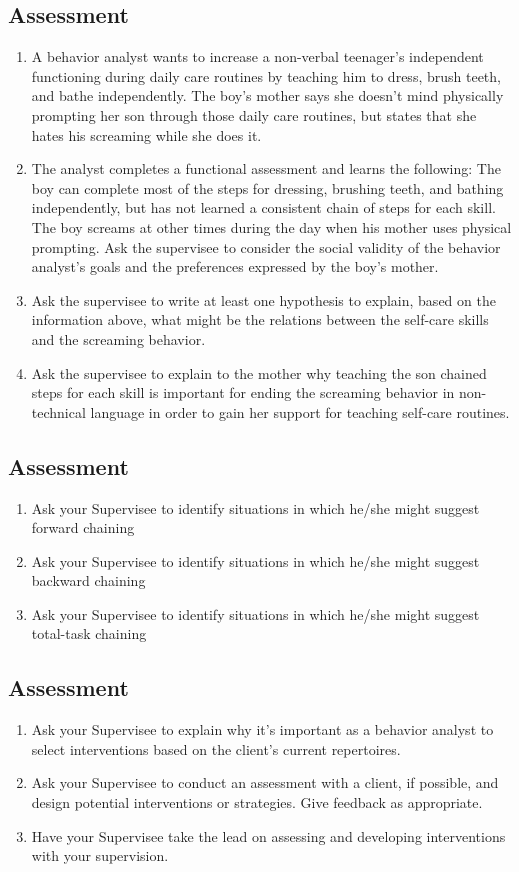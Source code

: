 \subsection{Assessment}
\begin{enumerate}
\item A behavior analyst wants to increase a non-verbal teenager's independent functioning during daily care routines by teaching him to dress, brush teeth, and bathe independently. The boy's mother says she doesn't mind physically prompting her son through those daily care routines, but states that she hates his screaming while she does it.

\item The analyst completes a functional assessment and learns the following: The boy can complete most of the steps for dressing, brushing teeth, and bathing independently, but has not learned a consistent chain of steps for each skill. The boy screams at other times during the day when his mother uses physical prompting. Ask the supervisee to consider the social validity of the behavior analyst's goals and the preferences expressed by the boy's mother. 

\item Ask the supervisee to write at least one hypothesis to explain, based on the information above, what might be the relations between the self-care skills and the screaming behavior.

\item Ask the supervisee to explain to the mother why teaching the son chained steps for each skill is important for ending the screaming behavior in non-technical language in order to gain her support for teaching self-care routines.
\end{enumerate}
%
\subsection{Assessment}
\begin{enumerate}
\item Ask your Supervisee to identify situations in which he/she might suggest forward chaining
\item Ask your Supervisee to identify situations in which he/she might suggest backward chaining
\item Ask your Supervisee to identify situations in which he/she might suggest total-task chaining
\end{enumerate}
%
\subsection{Assessment}
\begin{enumerate}
\item Ask your Supervisee to explain why it's important as a behavior analyst to select interventions based on the client's current repertoires. 
\item Ask your Supervisee to conduct an assessment with a client, if possible, and design potential interventions or strategies. Give feedback as appropriate.
\item Have your Supervisee take the lead on assessing and developing interventions with your supervision. 
%
\end{enumerate}
%
